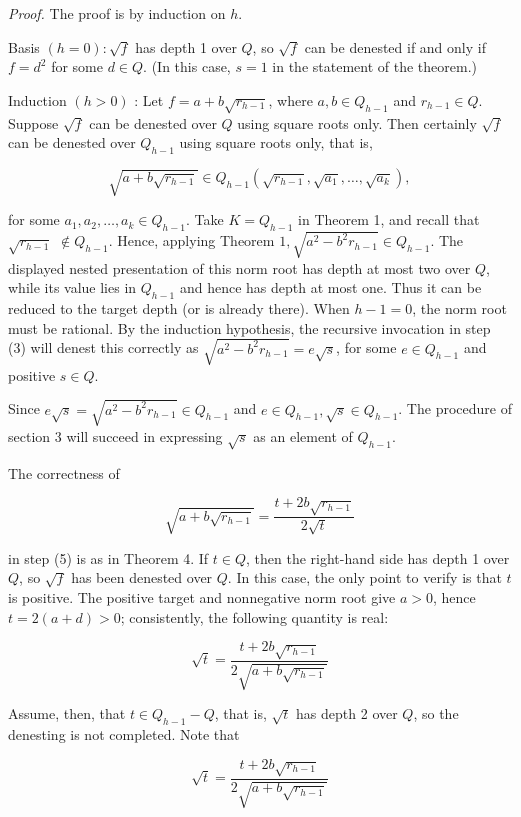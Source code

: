 \documentclass[11pt,letterpaper]{article}
\begin{document}
\noindent\textit{Proof.} The proof is by induction on $h$.

Basis $(h=0): \sqrt{f}$ has depth 1 over $Q$, so $\sqrt{f}$ can be denested if and only if $f=d^{2}$ for some $d \in Q$. (In this case, $s=1$ in the statement of the theorem.)

Induction $(h>0)$ : Let $f=a+b \sqrt{r_{h-1}}$, where $a, b \in Q_{h-1}$ and $r_{h-1} \in Q$. Suppose $\sqrt{f}$ can be denested over $Q$ using square roots only. Then certainly $\sqrt{f}$ can be denested over $Q_{h-1}$ using square roots only, that is,

\[
\sqrt{a+b \sqrt{r_{h-1}}} \in Q_{h-1}\left(\sqrt{r_{h-1}}, \sqrt{a_{1}}, \ldots, \sqrt{a_{k}}\right),
\]

for some $a_{1}, a_{2}, \ldots, a_{k} \in Q_{h-1}$. Take $K=Q_{h-1}$ in Theorem 1, and recall that $\sqrt{r_{h-1}}$ $\notin Q_{h-1}$. Hence, applying Theorem $1, \sqrt{a^{2}-b^{2} r_{h-1}} \in Q_{h-1}$. The displayed nested presentation of this norm root has depth at most two over $Q$, while its value lies in $Q_{h-1}$ and hence has depth at most one. Thus it can be reduced to the target depth (or is already there). When $h-1=0$, the norm root must be rational. By the induction hypothesis, the recursive invocation in step (3) will denest this correctly as $\sqrt{a^{2}-b^{2} r_{h-1}}=e \sqrt{s}$, for some $e \in Q_{h-1}$ and positive $s \in Q$.

Since $e \sqrt{s}=\sqrt{a^{2}-b^{2} r_{h-1}} \in Q_{h-1}$ and $e \in Q_{h-1}, \sqrt{s} \in Q_{h-1}$. The procedure of section 3 will succeed in expressing $\sqrt{s}$ as an element of $Q_{h-1}$.

The correctness of

\[
\sqrt{a+b \sqrt{r_{h-1}}}=\frac{t+2 b \sqrt{r_{h-1}}}{2 \sqrt{t}}
\]

in step (5) is as in Theorem 4. If $t \in Q$, then the right-hand side has depth 1 over $Q$, so $\sqrt{f}$ has been denested over $Q$. In this case, the only point to verify is that $t$ is positive. The positive target and nonnegative norm root give $a>0$, hence $t=2(a+d)>0$; consistently, the following quantity is real:

\[
\sqrt{t}=\frac{t+2 b \sqrt{r_{h-1}}}{2 \sqrt{a+b \sqrt{r_{h-1}}}}
\]

Assume, then, that $t \in Q_{h-1}-Q$, that is, $\sqrt{t}$ has depth 2 over $Q$, so the denesting is not completed. Note that

\[
\sqrt{t}=\frac{t+2 b \sqrt{r_{h-1}}}{2 \sqrt{a+b \sqrt{r_{h-1}}}}
\]
\end{document}
